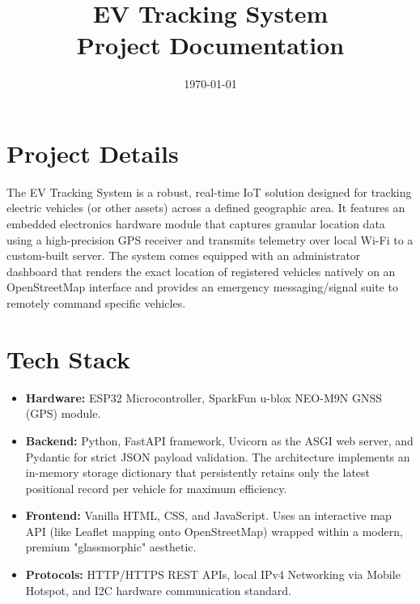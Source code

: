 \documentclass[a4paper,12pt]{article}
\title{\textbf{EV Tracking System}\\ \large Project Documentation}
\author{}
\date{\today}
\begin{document}
\maketitle

\tableofcontents
\newpage

\section{Project Details}
The EV Tracking System is a robust, real-time IoT solution designed for tracking electric vehicles (or other assets) across a defined geographic area. It features an embedded electronics hardware module that captures granular location data using a high-precision GPS receiver and transmits telemetry over local Wi-Fi to a custom-built server. The system comes equipped with an administrator dashboard that renders the exact location of registered vehicles natively on an OpenStreetMap interface and provides an emergency messaging/signal suite to remotely command specific vehicles.

\section{Tech Stack}
\begin{itemize}
    \item \textbf{Hardware:} ESP32 Microcontroller, SparkFun u-blox NEO-M9N GNSS (GPS) module.
    \item \textbf{Backend:} Python, FastAPI framework, Uvicorn as the ASGI web server, and Pydantic for strict JSON payload validation. The architecture implements an in-memory storage dictionary that persistently retains only the latest positional record per vehicle for maximum efficiency.
    \item \textbf{Frontend:} Vanilla HTML, CSS, and JavaScript. Uses an interactive map API (like Leaflet mapping onto OpenStreetMap) wrapped within a modern, premium "glassmorphic" aesthetic.
    \item \textbf{Protocols:} HTTP/HTTPS REST APIs, local IPv4 Networking via Mobile Hotspot, and I2C hardware communication standard.
\end{itemize}
\end{document}
